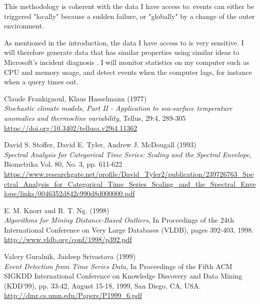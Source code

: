 \documentclass[12pt,a4paper]{article}
\begin{document}
This methodology is coherent with the data I have access to: events can either be triggered "locally" because a sudden failure, or "globally" by a change of the outer environment.

As mentioned in the introduction, the data I have access to is very sensitive. I will therefore generate data that has similar properties using similar ideas to Microsoft's incident diagnosis \cite{incident-diagnosis}. I will monitor statistics on my computer such as CPU and memory usage, and detect events when the computer lags, for instance when a query times out.

\clearpage

\begin{thebibliography}{9}
Claude Frankignoul, Klaus Hasselmann (1977) \\
\textit{Stochastic climate models, Part II - Application to sea-surface temperature anomalies and thermocline variability},
Tellus, 29:4, 289-305\\
\url{https://doi.org/10.3402/tellusa.v29i4.11362}

David S. Stoffer, David E. Tyler, Andrew J. McDougall (1993)\\
\textit{Spectral Analysis for Categorical Time Series: Scaling and the Spectral Envelope},
Biometrika Vol. 80, No. 3, pp. 611-622\\
\url{https://www.researchgate.net/profile/David_Tyler2/publication/239726763_Spectral_Analysis_for_Categorical_Time_Series_Scaling_and_the_Spectral_Envelope/links/0046352d842c990d8d000000.pdf}

E. M. Knorr and R. T. Ng. (1998)\\
\textit{Algorithms for Mining Distance-Based Outliers}, In Proceedings of the 24th
International Conference on Very Large Databases (VLDB), pages 392-403, 1998.\\
\url{http://www.vldb.org/conf/1998/p392.pdf}

Valery Guralnik, Jaideep Srivastava (1999)\\
\textit{Event Detection from Time Series Data}, In Proceedings of the Fifth ACM SIGKDD International Conference on Knowledge Discovery and Data Mining (KDD'99), pp. 33-42, August 15-18, 1999, San Diego, CA, USA. \\
\url{http://dmr.cs.umn.edu/Papers/P1999_6.pdf}


\end{thebibliography}
\end{document}
